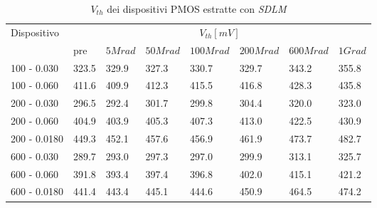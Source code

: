 \documentclass[12pt, letterpaper]{book}
\begin{document}
\begin{table}[H]
  \renewcommand{\arraystretch}{1.3}
  \begin{tabular}{m{2.1cm} m{0.8cm} m{1.1cm} m{1.3cm} m{1.5cm} m{1.5cm} m{1.5cm} m{1cm}}
    \toprule
    \multirow{2}{*}{Dispositivo} & \multicolumn{7}{c}{$V_{th} [mV] $}                                                                    \\
    \cmidrule{2-8}
                                 & pre                                & $5Mrad$ & $50Mrad$ & $100Mrad$ & $200Mrad$ & $600Mrad$ & $1Grad$ \\
    \midrule
    100 - 0.030                     & 323.5                              & 329.9   & 327.3    & 330.7     & 329.7     & 343.2     & 355.8   \\
    \hline
    100 - 0.060                     & 411.6                              & 409.9   & 412.3    & 415.5     & 416.8     & 428.3     & 435.8   \\
    \hline
    200 - 0.030                     & 296.5                              & 292.4   & 301.7    & 299.8     & 304.4     & 320.0     & 323.0   \\
    \hline
    200 - 0.060                     & 404.9                              & 403.9   & 405.3    & 407.3     & 413.0     & 422.5     & 430.9   \\
    \hline
    200 - 0.0180                    & 449.3                              & 452.1   & 457.6    & 456.9     & 461.9     & 473.7     & 482.7   \\
    \hline
    600 - 0.030                     & 289.7                              & 293.0   & 297.3    & 297.0     & 299.9     & 313.1     & 325.7   \\
    \hline
    600 - 0.060                     & 391.8                              & 393.4   & 397.4    & 396.8     & 402.0     & 415.1     & 421.2   \\
    \hline
    600 - 0.0180                    & 441.4                              & 443.4   & 445.1    & 444.6     & 450.9     & 464.5     & 474.2   \\
    \bottomrule
  \end{tabular}
  \caption{$V_{th}$ dei dispositivi PMOS estratte con \emph{SDLM}}
  \label{tab:VthSDLMP}
\end{table}
\end{document}
